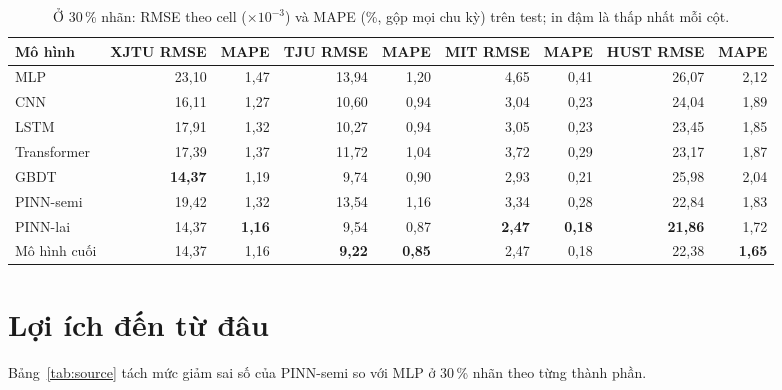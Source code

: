 \documentclass[12pt,a4paper,oneside]{report}
\theoremstyle{plain}
\theoremstyle{definition}
\begin{document}
\begin{table}[!htbp]\centering\footnotesize
\caption[RMSE và MAPE của mọi mô hình chính ở 30\,\% nhãn]{Ở 30\,\% nhãn: RMSE theo cell ($\times10^{-3}$) và MAPE (\%, gộp mọi chu kỳ) trên test; in đậm là thấp nhất mỗi cột.}\label{tab:allrm}
\begin{adjustbox}{max width=\textwidth}\begin{tabular}{lrrrrrrrr}\toprule
Mô hình & XJTU RMSE & MAPE & TJU RMSE & MAPE & MIT RMSE & MAPE & HUST RMSE & MAPE \\\midrule
MLP & 23{,}10 & 1{,}47 & 13{,}94 & 1{,}20 & 4{,}65 & 0{,}41 & 26{,}07 & 2{,}12 \\
CNN & 16{,}11 & 1{,}27 & 10{,}60 & 0{,}94 & 3{,}04 & 0{,}23 & 24{,}04 & 1{,}89 \\
LSTM & 17{,}91 & 1{,}32 & 10{,}27 & 0{,}94 & 3{,}05 & 0{,}23 & 23{,}45 & 1{,}85 \\
Transformer & 17{,}39 & 1{,}37 & 11{,}72 & 1{,}04 & 3{,}72 & 0{,}29 & 23{,}17 & 1{,}87 \\
GBDT & \textbf{14{,}37} & 1{,}19 & 9{,}74 & 0{,}90 & 2{,}93 & 0{,}21 & 25{,}98 & 2{,}04 \\
PINN-semi & 19{,}42 & 1{,}32 & 13{,}54 & 1{,}16 & 3{,}34 & 0{,}28 & 22{,}84 & 1{,}83 \\
PINN-lai & 14{,}37 & \textbf{1{,}16} & 9{,}54 & 0{,}87 & \textbf{2{,}47} & \textbf{0{,}18} & \textbf{21{,}86} & 1{,}72 \\
Mô hình cuối & 14{,}37 & 1{,}16 & \textbf{9{,}22} & \textbf{0{,}85} & 2{,}47 & 0{,}18 & 22{,}38 & \textbf{1{,}65} \\
\bottomrule\end{tabular}\end{adjustbox}\end{table}

\section{Lợi ích đến từ đâu}\label{sec:source}

Bảng~\ref{tab:source} tách mức giảm sai số của PINN-semi so với MLP ở 30\,\% nhãn theo từng thành phần.
\end{document}
